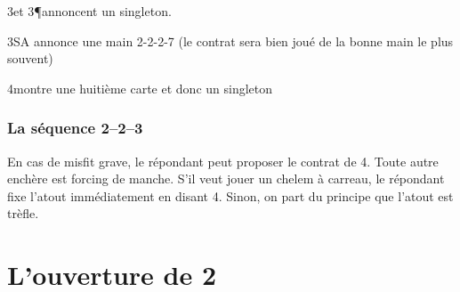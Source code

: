 \begin{multicols}{2}
 3\C et 3\P annoncent un singleton.

 3SA annonce une main 2-2-2-7 (le contrat sera bien joué de la bonne main le plus souvent)

 4\T montre une huitième carte et donc un singleton \K

 \subsection*{La séquence 2\T--2\K--3\K}

 En cas de misfit grave, le répondant peut proposer le contrat de 4\T. Toute autre enchère est forcing de manche. S'il veut jouer un chelem à carreau, le répondant fixe l'atout immédiatement en disant 4\K. Sinon, on part du principe que l'atout est trèfle.

\end{multicols}


\chapter{L'ouverture de 2\K}

